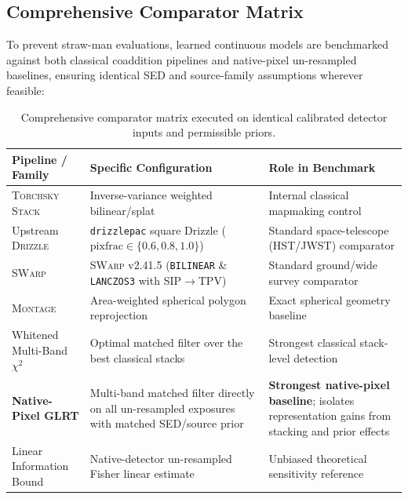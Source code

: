 \documentclass[11pt,a4paper]{article}
\begin{document}
\subsection{Comprehensive Comparator Matrix}
To prevent straw-man evaluations, learned continuous models are benchmarked against both classical coaddition pipelines and native-pixel un-resampled baselines, ensuring identical SED and source-family assumptions wherever feasible:
\begin{table}[htbp]
\centering
\small
\begin{tabularx}{\textwidth}{l p{5.5cm} X}
\toprule
\textbf{Pipeline / Family} & \textbf{Specific Configuration} & \textbf{Role in Benchmark} \\
\midrule
\textsc{Torchsky Stack} & Inverse-variance weighted bilinear/splat & Internal classical mapmaking control \\
Upstream \textsc{Drizzle} & \texttt{drizzlepac} square Drizzle ($\mathrm{pixfrac} \in \{0.6, 0.8, 1.0\}$) & Standard space-telescope (HST/JWST) comparator \\
\textsc{SWarp} & \textsc{SWarp} v2.41.5 (\texttt{BILINEAR} \& \texttt{LANCZOS3} with SIP$\to$TPV) & Standard ground/wide survey comparator \\
\textsc{Montage} & Area-weighted spherical polygon reprojection & Exact spherical geometry baseline \\
Whitened Multi-Band $\chi^2$ & Optimal matched filter over the best classical stacks & Strongest classical stack-level detection \\
\textbf{Native-Pixel GLRT} & Multi-band matched filter directly on all un-resampled exposures with matched SED/source prior & \textbf{Strongest native-pixel baseline}; isolates representation gains from stacking and prior effects \\
Linear Information Bound & Native-detector un-resampled Fisher linear estimate & Unbiased theoretical sensitivity reference \\
\bottomrule
\end{tabularx}
\caption{Comprehensive comparator matrix executed on identical calibrated detector inputs and permissible priors.}
\label{tab:baselines}
\end{table}
\end{document}
